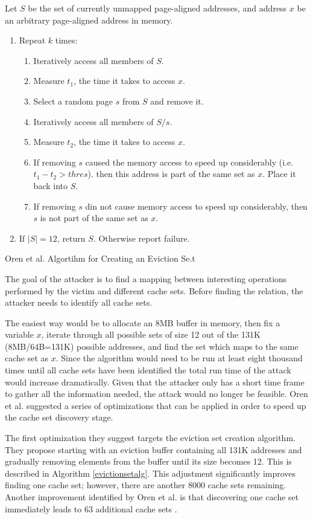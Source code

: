 \documentclass[10pt,a4paper,twoside]{book}
\begin{document}
\begin{algorithm}
Let $S$ be the set of currently unmapped page-aligned addresses, and address $x$ be an arbitrary page-aligned address in memory.
\begin{enumerate}
\item Repeat $k$ times:
\begin{enumerate}
\item Iteratively access all members of $S$.
\item Measure $t_1$, the time it takes to access $x$.
\item Select a random page $s$ from $S$ and remove it.
\item Iteratively access all members of $S/s$.
\item Measure $t_2$, the time it takes to access $x$.
\item If removing $s$ caused the memory access to speed up considerably (i.e. $t_1 - t_2 > thres$). then this address is part of the same set as $x$. Place it back into $S$.
\item If removing $s$ din not cause memory access to speed up considerably, then $s$ is not part of the same set as $x$.
\end{enumerate}
\item If $|S| = 12$, return $S$. Otherwise report failure.
\end{enumerate}
\caption{Oren et al. Algortihm for Creating an Eviction Se.t}
\label{evictionsetalg}
\end{algorithm}

The goal of the attacker is to find a mapping between interesting operations performed by the victim and different cache sets. Before finding the relation, the attacker needs to identify all cache sets.


The easiest way would be to allocate an 8MB buffer in memory, then fix a variable $x$, iterate through all possible sets of size 12 out of the 131K (8MB/64B=131K) possible addresses, and find the set which maps to the same cache set as $x$. Since the algorithm would need to be run at least eight thousand times until all cache sets have been identified the total run time of the attack would increase dramatically. Given that the attacker only has a short time frame to gather all the information needed, the attack would no longer be feasible. Oren et al. suggested a series of optimizations that can be applied in order to speed up the cache set discovery stage. 

The first optimization they suggest targets the eviction set creation algorithm. They propose starting with an eviction buffer containing all 131K addresses and gradually removing elements from the buffer until its size becomes 12. This is described in Algorithm \ref{evictionsetalg}. This adjustment significantly improves finding one cache set; however, there are another 8000 cache sets remaining. Another improvement identified by Oren et al. is that discovering one cache set immediately leads to 63 additional cache sets \cite{oren2015spy}.
\end{document}
